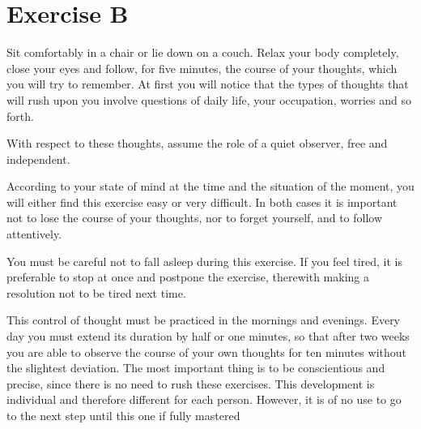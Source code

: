 \section{Exercise B}

Sit comfortably in a chair or lie down on a couch. Relax your body completely, close your eyes and follow, for five minutes, the course of your thoughts, which you will try to remember. At first you will notice that the types of thoughts that will rush upon you involve questions of daily life, your occupation, worries and so forth.

With respect to these thoughts, assume the role of a quiet observer, free and independent.

According to your state of mind at the time and the situation of the moment, you will either find this exercise easy or very difficult. In both cases it is important not to lose the course of your thoughts, nor to forget yourself, and to follow attentively.

You must be careful not to fall asleep during this exercise. If you feel tired, it is preferable to stop at once and postpone the exercise, therewith making a resolution not to be tired next time.

This control of thought must be practiced in the mornings and evenings. Every day you must extend its duration by half or one minutes, so that after two weeks you are able to observe the course of your own thoughts for ten minutes without the slightest deviation. The most important thing is to be conscientious and precise, since there is no need to rush these exercises. This development is individual and therefore different for each person. However, it is of no use to go to the next step until this one if fully mastered